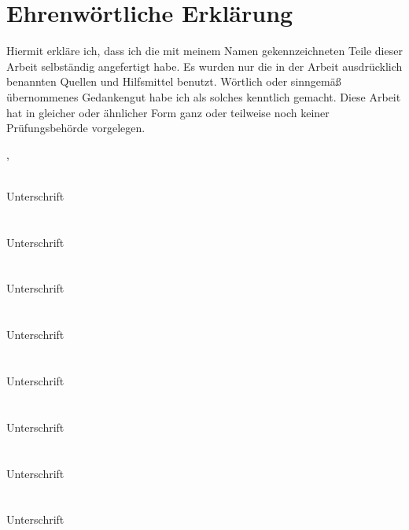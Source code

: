 
\section*{Ehrenwörtliche Erklärung}

Hiermit erkläre ich, dass ich die mit meinem Namen gekennzeichneten Teile dieser Arbeit selbständig angefertigt habe. Es wurden nur die in der Arbeit ausdrücklich benannten Quellen und Hilfsmittel benutzt. Wörtlich oder sinngemäß übernommenes Gedankengut habe ich als solches kenntlich gemacht. Diese Arbeit hat in gleicher oder ähnlicher Form ganz oder teilweise noch keiner Prüfungsbehörde vorgelegen.
\vspace{10mm}

\ort, \abgabedatum
\vspace{10mm}

\underline{\hspace{8cm}}\\ Unterschrift
\\ \\
\underline{\hspace{8cm}}\\ Unterschrift 
\\ \\
\underline{\hspace{8cm}}\\ Unterschrift
\\ \\
\underline{\hspace{8cm}}\\ Unterschrift
\\ \\
\underline{\hspace{8cm}}\\ Unterschrift
\\ \\
\underline{\hspace{8cm}}\\ Unterschrift
\\ \\
\underline{\hspace{8cm}}\\ Unterschrift
\\ \\
\underline{\hspace{8cm}}\\ Unterschrift